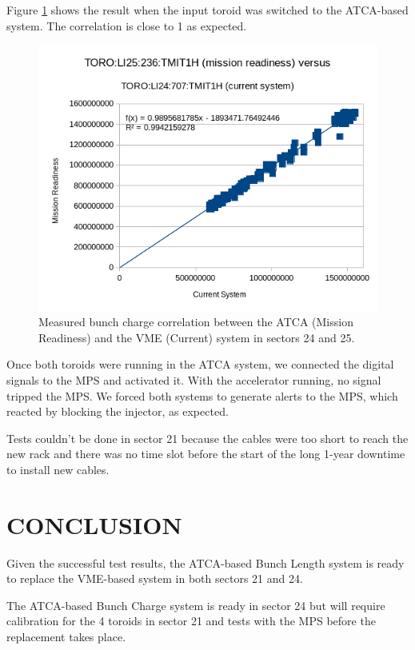 \documentclass[letter,
        biblatex,   %
        keeplastbox,  %
        ]{jacow}
\begin{document}
Figure \ref{fig:bcm_result} shows the result when the input toroid was switched to the ATCA-based system. The correlation is close to 1 as expected.

\begin{figure}[!htb]
  \centering
  \includegraphics*[width=\columnwidth]{bcm_result}
  \caption{Measured bunch charge correlation between the ATCA (Mission Readiness) and the VME (Current) system in sectors 24 and 25.}
  \label{fig:bcm_result}
\end{figure}

Once both toroids were running in the ATCA system, we connected the digital signals to the MPS and activated it. With the accelerator running, no signal tripped the MPS. We forced both systems to generate alerts to the MPS, which reacted by blocking the injector, as expected.

Tests couldn't be done in sector 21 because the cables were too short to reach the new rack and there was no time slot before the start of the long 1-year downtime to install new cables.

\section{CONCLUSION}
Given the successful test results, the ATCA-based Bunch Length system is ready to replace the VME-based system in both sectors 21 and 24.

The ATCA-based Bunch Charge system is ready in sector 24 but will require calibration for the 4 toroids in sector 21 and tests with the MPS before the replacement takes place.
\end{document}

